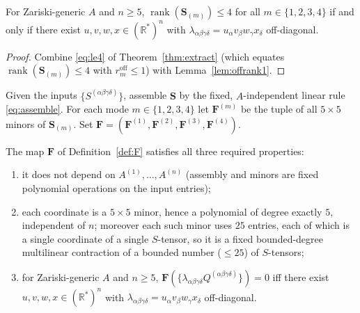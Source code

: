 \begin{theorem}[Characterisation]\label{thm:char}
For Zariski-generic $A$ and $n\ge5$, $\operatorname{rank}(\mathbf S_{(m)})\le4$ for all
$m\in\{1,2,3,4\}$ if and only if there exist $u,v,w,x\in(\mathbb R^*)^n$ with
$\lambda_{\alpha\beta\gamma\delta}=u_\alpha v_\beta w_\gamma x_\delta$ off-diagonal.
\end{theorem}

\begin{proof}
Combine \eqref{eq:le4} of Theorem~\ref{thm:extract} (which equates
$\operatorname{rank}(\mathbf S_{(m)})\le4$ with $r_m^{\mathrm{off}}\le1$) with
Lemma~\ref{lem:offrank1}.
\end{proof}

\begin{definition}\label{def:F}
Given the inputs $\{S^{(\alpha\beta\gamma\delta)}\}$, assemble $\mathbf S$ by the fixed,
$A$-independent linear rule \eqref{eq:assemble}. For each mode $m\in\{1,2,3,4\}$ let
$\mathbf F^{(m)}$ be the tuple of all $5\times5$ minors of $\mathbf S_{(m)}$. Set
$\mathbf F=(\mathbf F^{(1)},\mathbf F^{(2)},\mathbf F^{(3)},\mathbf F^{(4)})$.
\end{definition}

\begin{theorem}\label{thm:main}
The map $\mathbf F$ of Definition~\ref{def:F} satisfies all three required properties:
\begin{enumerate}
\item it does not depend on $A^{(1)},\dots,A^{(n)}$ (assembly and minors are fixed
polynomial operations on the input entries);
\item each coordinate is a $5\times5$ minor, hence a polynomial of degree exactly $5$,
independent of $n$; moreover each such minor uses $25$ entries, each of which is a single
coordinate of a single $S$-tensor, so it is a fixed bounded-degree multilinear
contraction of a bounded number ($\le25$) of $S$-tensors;
\item for Zariski-generic $A$ and $n\ge5$,
$\mathbf F(\{\lambda_{\alpha\beta\gamma\delta}Q^{(\alpha\beta\gamma\delta)}\})=0$ iff
there exist $u,v,w,x\in(\mathbb R^*)^n$ with
$\lambda_{\alpha\beta\gamma\delta}=u_\alpha v_\beta w_\gamma x_\delta$ off-diagonal.
\end{enumerate}
\end{theorem}

